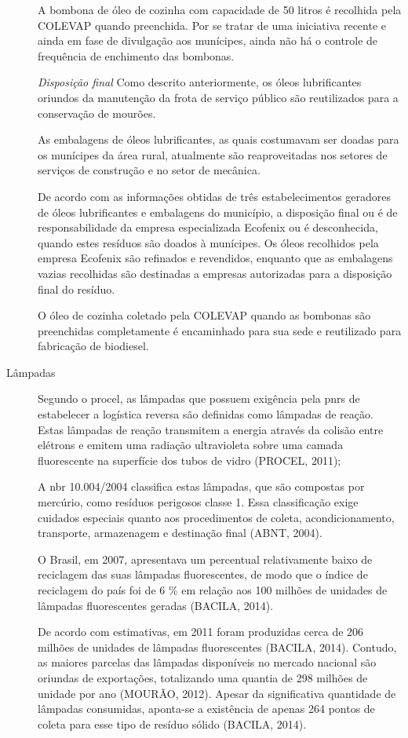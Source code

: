 \begin{description}
	A bombona de óleo de cozinha com capacidade de 50 litros é recolhida pela COLEVAP quando preenchida. Por se tratar de uma iniciativa recente e ainda em fase de divulgação aos munícipes, ainda não há o controle de frequência de enchimento das bombonas.
	
		\subitem \textit{Disposição final}
		Como descrito anteriormente, os óleos lubrificantes oriundos da manutenção da frota de serviço público são reutilizados para a conservação de mourões. 
	
	As embalagens de óleos lubrificantes, as quais costumavam ser doadas para os munícipes da área rural, atualmente são reaproveitadas nos setores de serviços de construção e no setor de mecânica.
	
	De acordo com as informações obtidas de três estabelecimentos geradores de óleos lubrificantes e embalagens do município, a disposição final ou é de responsabilidade da empresa especializada Ecofenix ou é desconhecida, quando estes resíduos são doados à munícipes. Os óleos recolhidos pela empresa Ecofenix são refinados e revendidos, enquanto que as embalagens vazias recolhidas são destinadas a empresas autorizadas para a disposição final do resíduo.
	
	O óleo de cozinha coletado pela COLEVAP quando as bombonas são preenchidas completamente é encaminhado para sua sede e reutilizado para fabricação de biodiesel.
	
	
	\item[Lâmpadas] Segundo o \gls{procel}, as lâmpadas que possuem exigência pela \gls{pnrs} de estabelecer a logística reversa são definidas como lâmpadas de reação. Estas lâmpadas de reação transmitem a energia através da colisão entre elétrons e emitem uma radiação ultravioleta sobre uma camada fluorescente na superfície dos tubos de vidro (PROCEL, 2011);
	
	A \gls{nbr} 10.004/2004 classifica estas lâmpadas, que são compostas por mercúrio, como resíduos perigosos classe 1. Essa classificação exige cuidados especiais quanto aos procedimentos de coleta, acondicionamento, transporte, armazenagem e destinação final (ABNT, 2004).
	
	O Brasil, em 2007, apresentava um percentual relativamente baixo de reciclagem das suas lâmpadas fluorescentes, de modo que o índice de reciclagem do país foi de 6 \% em relação aos 100 milhões de unidades de lâmpadas fluorescentes geradas (BACILA, 2014).
	
	De acordo com estimativas, em 2011 foram produzidas cerca de 206 milhões de unidades de lâmpadas fluorescentes (BACILA, 2014). Contudo, as maiores parcelas das lâmpadas disponíveis no mercado nacional são oriundas de exportações, totalizando uma quantia de 298 milhões de unidade por ano (MOURÃO, 2012).
	Apesar da significativa quantidade de lâmpadas consumidas, aponta-se a existência de apenas 264 pontos de coleta para esse tipo de resíduo sólido (BACILA, 2014).
	

\end{description}
